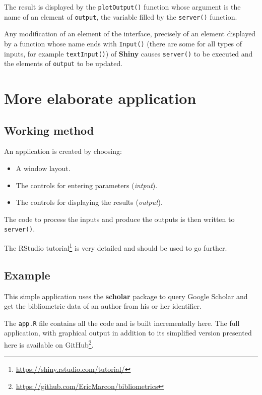 \documentclass[
  12pt,
  american,
  a4paper,
  extrafontsizes,onecolumn,openright
  ]{memoir}
\providecommand{\tightlist}{%
  \setlength{\itemsep}{0pt}\setlength{\parskip}{0pt}}
\newlength{\rf}
\begin{document}
The result is displayed by the \texttt{plotOutput()} function whose argument is the name of an element of \texttt{output}, the variable filled by the \texttt{server()} function.

Any modification of an element of the interface, precisely of an element displayed by a function whose name ends with \texttt{Input()} (there are some for all types of inputs, for example \texttt{textInput()}) of \textbf{Shiny} causes \texttt{server()} to be executed and the elements of \texttt{output} to be updated.

\hypertarget{more-elaborate-application}{%
\section{More elaborate application}\label{more-elaborate-application}}

\hypertarget{working-method}{%
\subsection{Working method}\label{working-method}}

An application is created by choosing:

\begin{itemize}
\tightlist
\item
  A window layout.
\item
  The controls for entering parameters (\emph{intput}).
\item
  The controls for displaying the results (\emph{output}).
\end{itemize}

The code to process the inputs and produce the outputs is then written to \texttt{server()}.

The RStudio tutorial\footnote{\url{https://shiny.rstudio.com/tutorial/}} is very detailed and should be used to go further.

\hypertarget{example}{%
\subsection{Example}\label{example}}

This simple application uses the \textbf{scholar} package to query Google Scholar and get the bibliometric data of an author from his or her identifier.

The \texttt{app.R} file contains all the code and is built incrementally here.
The full application, with graphical output in addition to its simplified version presented here is available on GitHub\footnote{\url{https://github.com/EricMarcon/bibliometrics}}.
\end{document}
